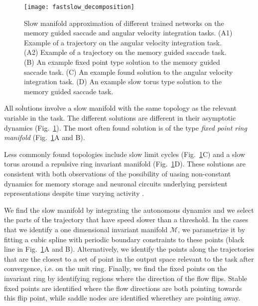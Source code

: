 \documentclass{article} %
\newcounter{ct}
\newcommand{\manifold}{\mathcal{M}}
\theoremstyle{definition}
\theoremstyle{remark}
\begin{document}
\begin{figure}[tbhp]
  \centering
  \texttt{[image: fastslow\_decomposition]}
  \caption{Slow manifold approximation of different trained networks on the memory guided saccade and angular velocity integration tasks.
 (A1) Example of a trajectory on the  angular velocity integration task.
 (A2)  Example of a trajectory on the  memory guided saccade task.
 (B) An example fixed point type solution to the memory guided saccade task.
 (C) An example found solution to the angular velocity integration task.
 (D) An example slow torus type solution to the memory guided saccade task.
}
  \label{fig:fastslow_decomposition}
\end{figure}


All solutions involve a slow manifold with the same topology as the relevant variable in the task.  %
The different solutions are different in their asymptotic dynamics (Fig.~\ref{fig:fastslow_decomposition}).
The most often found solution is of the type \emph{fixed point ring manifold} (Fig.~\ref{fig:fastslow_decomposition}A and B).
  
   
Less commonly found topologies include slow limit cycles (Fig.~\ref{fig:fastslow_decomposition}C) and a slow torus around a repulsive ring invariant manifold (Fig.~\ref{fig:fastslow_decomposition}D).
 These solutions are consistent with both observations of the possibility of uasing non-constant dynamics for memory storage \citep{hirsch1995computing,Park2023a} and neuronal circuits underlying persistent representations despite time varying activity \citep{druckmann2012neuronal}.
  
We find the slow manifold  by integrating the autonomous dynamics and we select the parts of the trajectory that have speed slower than a threshold.
%
In the cases that we identify a one dimensional invariant manifold $\manifold$, we parametrize it by fitting a cubic spline with periodic boundary constraints to these points (black line in Fig.~\ref{fig:fastslow_decomposition}A and B).
Alternatively, we identify the points along the trajectories that are the closest to a set of point in the output space relevant to the task after convergence, i.e. on the unit ring.
Finally, we find the fixed points on the invariant ring by identifying regions where the direction of the flow flips.
Stable fixed points are identified where the flow directions are both pointing towards this flip point, 
while saddle nodes are identified wherethey are pointing away.
\end{document}
